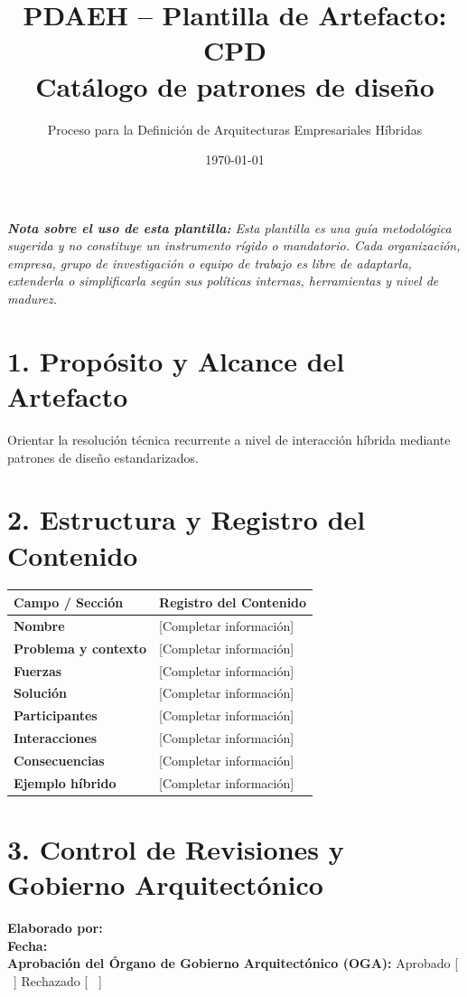 \documentclass[11pt,a4paper]{article}
\title{\textbf{\color{brandgreen} PDAEH -- Plantilla de Artefacto: CPD} \\[0.3em] \large Catálogo de patrones de diseño}
\author{Proceso para la Definición de Arquitecturas Empresariales Híbridas}
\date{\today}
\begin{document}
\maketitle

\noindent \textit{\textbf{Nota sobre el uso de esta plantilla:} Esta plantilla es una guía metodológica sugerida y no constituye un instrumento rígido o mandatorio. Cada organización, empresa, grupo de investigación o equipo de trabajo es libre de adaptarla, extenderla o simplificarla según sus políticas internas, herramientas y nivel de madurez.}

\section*{1. Propósito y Alcance del Artefacto}
Orientar la resolución técnica recurrente a nivel de interacción híbrida mediante patrones de diseño estandarizados.

\section*{2. Estructura y Registro del Contenido}
\begin{tabularx}{\textwidth}{|>{\bfseries}p{4.5cm}|X|}
    \hline
    \rowcolor[gray]{0.92} Campo / Sección & Registro del Contenido \\ \hline
    \textbf{Nombre} & [Completar información] \\ \hline
    \textbf{Problema y contexto} & [Completar información] \\ \hline
    \textbf{Fuerzas} & [Completar información] \\ \hline
    \textbf{Solución} & [Completar información] \\ \hline
    \textbf{Participantes} & [Completar información] \\ \hline
    \textbf{Interacciones} & [Completar información] \\ \hline
    \textbf{Consecuencias} & [Completar información] \\ \hline
    \textbf{Ejemplo híbrido} & [Completar información] \\ \hline
\end{tabularx}

\vspace{1.2cm}
\section*{3. Control de Revisiones y Gobierno Arquitectónico}
\noindent \textbf{Elaborado por:} \hrulefill \\[0.5em]
\textbf{Fecha:} \hrulefill \\[0.5em]
\textbf{Aprobación del Órgano de Gobierno Arquitectónico (OGA):} Aprobado [ \, ] \quad Rechazado [ \, ]
\end{document}
